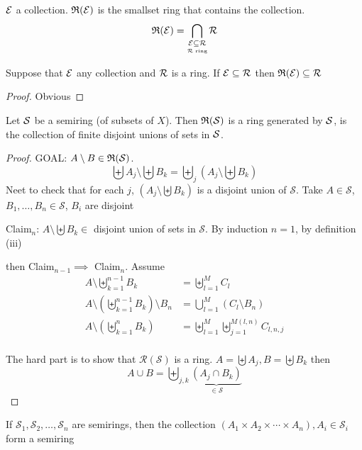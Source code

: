 \begin{definition}
  $\mathcal E$ a collection. $\mathfrak R(\mathcal E)$ is the smallset ring that contains the collection. 
  \[\mathfrak R(\mathcal E) = \bigcap_{\underset{\mathcal R \text{ ring}}{\mathcal E \subseteq \mathcal R}} \mathcal R\]
\end{definition}

\begin{lemma}
  Suppose that $\mathcal E$ any collection and $\mathcal R$ is a ring. If $\mathcal E \subseteq \mathcal R$ then $\mathfrak R(\mathcal E) \subseteq \mathcal R$
\end{lemma}

\begin{proof}
  Obvious
\end{proof}

\begin{theorem}
  Let $\mathcal S$ be a semiring (of subsets of $X$). Then $\mathfrak R(\mathcal S)$ is a ring generated by $\mathcal S$,
  is the collection of finite disjoint unions of sets in $\mathcal S$.
\end{theorem}

\begin{proof}
  GOAL: $A \setminus B \in \mathfrak R(\mathcal{S})$.
  \[\biguplus A_j \setminus \biguplus B_k = \biguplus_j (A_j \setminus \biguplus B_k)\]
  Neet to check that for each $j$, $(A_j \setminus \biguplus B_k)$ is a disjoint union of $\mathcal{S}$. 
  Take $A \in \mathcal{S}$, $B_1, \dotsc, B_n \in \mathcal{S}$, $B_i$ are disjoint

  Claim$_n$: $A \setminus \biguplus B_k \in$ disjoint union of sets in $\mathcal{S}$.
  By induction $n = 1$, by definition (iii)

  then Claim$_{n-1} \implies$ Claim$_n$. Assume 
  \begin{align*}
    A \setminus \biguplus_{k=1}^{n-1}B_k &= \biguplus_{l=1}^M C_l \\
    A \setminus \left(\biguplus_{k=1}^{n-1}B_k\right) \setminus B_n &= \bigcup_{l=1}^M (C_l\setminus B_n) \\
    A \setminus \left(\biguplus_{k=1}^{n}B_k\right) &= \biguplus_{l=1}^M\biguplus_{j=1}^{M(l, n)}C_{l,n,j} \\ 
  \end{align*}

  The hard part is to show that $\mathcal{R}(\mathcal{S})$ is a ring.
  $A = \biguplus A_j, B = \biguplus B_k$ then
  \[A \cup B = \biguplus_{j,k} \underbrace{(A_j \cap B_k)}_{\in \mathcal{S}}\]
\end{proof}

\begin{lemma}
  If $\mathcal{S}_1, \mathcal{S}_2, \dotsc, \mathcal{S}_n$ are semirings, then 
  the collection $(A_1 \times A_2 \times \dotsm \times A_n), A_i \in \mathcal{S}_i$
  form a semiring
\end{lemma}

